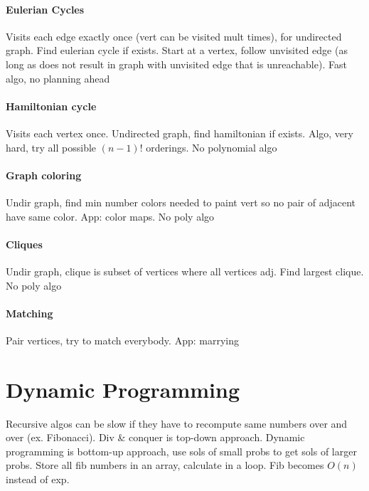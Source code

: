 \paragraph{Eulerian Cycles} Visits each edge exactly once (vert can be visited mult times), for undirected graph. Find eulerian cycle if exists. Start at a vertex, follow unvisited edge (as long as does not result in graph with unvisited edge that is unreachable). Fast algo, no planning ahead
\vspace{-7 pt}
\paragraph{Hamiltonian cycle} Visits each vertex once. Undirected graph, find hamiltonian if exists. Algo, very hard, try all possible $(n-1)!$ orderings. No polynomial algo
\vspace{-7 pt}
\paragraph{Graph coloring} Undir graph, find min number colors needed to paint vert so no pair of adjacent have same color. App: color maps. No poly algo
\vspace{-7 pt}
\paragraph{Cliques} Undir graph, clique is subset of vertices where all vertices adj. Find largest clique. No poly algo
\vspace{-7 pt}
\paragraph{Matching} Pair vertices, try to match everybody. App: marrying
\color{Periwinkle}
\section{\textcolor{Periwinkle}{Dynamic Programming}}
Recursive algos can be slow if they have to recompute same numbers over and over (ex. Fibonacci). Div \& conquer is top-down approach. Dynamic programming is bottom-up approach, use sols of small probs to get sols of larger probs. Store all fib numbers in an array, calculate in a loop. Fib becomes $O(n)$ instead of exp.
\vspace{-7 pt}

